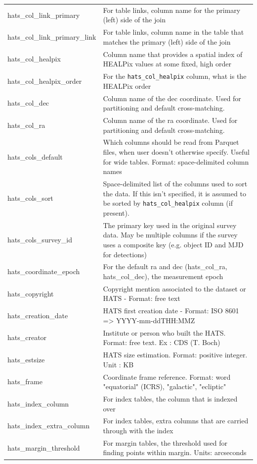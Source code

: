 \documentclass[11pt,a4paper]{ivoa}
\begin{document}
{\begin{longtable}[h!]{p{} p{}}
hats\_col\_link\_primary &For table links, column name for the primary (left) side of the join \\
hats\_col\_link\_primary\_link &For table links, column name in the table that matches the primary (left) side of the join \\
hats\_col\_healpix &Column name that provides a spatial index of HEALPix values at some fixed, high order \\
hats\_col\_healpix\_order &For the \texttt{hats\_col\_healpix} column, what is the HEALPix order \\
hats\_col\_dec &Column name of the dec coordinate. Used for partitioning and default cross-matching. \\
hats\_col\_ra &Column name of the ra coordinate. Used for partitioning and default cross-matching. \\
hats\_cols\_default &Which columns should be read from Parquet files, when user doesn't otherwise specify. Useful for wide tables. Format: space-delimited column names \\
hats\_cols\_sort &Space-delimited list of the columns used to sort the data. If this isn't specified, it is assumed to be sorted by \texttt{hats\_col\_healpix} column (if present). \\
hats\_cols\_survey\_id &The primary key used in the original survey data. May be multiple columns if the survey uses a composite key (e.g. object ID and MJD for detections) \\
hats\_coordinate\_epoch &For the default ra and dec (hats\_col\_ra, hats\_col\_dec), the measurement epoch \\
hats\_copyright &Copyright mention associated to the dataset or HATS - Format: free text \\
hats\_creation\_date &HATS first creation date - Format: ISO 8601 => YYYY-mm-ddTHH:MMZ \\
hats\_creator &Institute or person who built the HATS. Format: free text. Ex : CDS (T. Boch) \\
hats\_estsize &HATS size estimation. Format: positive integer. Unit : KB \\
hats\_frame &Coordinate frame reference. Format: word "equatorial" (ICRS), "galactic", "ecliptic" \\
hats\_index\_column &For index tables, the column that is indexed over \\
hats\_index\_extra\_column &For index tables, extra columns that are carried through with the index \\
hats\_margin\_threshold &For margin tables, the threshold used for finding points within margin. Units: arcseconds \\

\end{longtable}}
\end{document}
